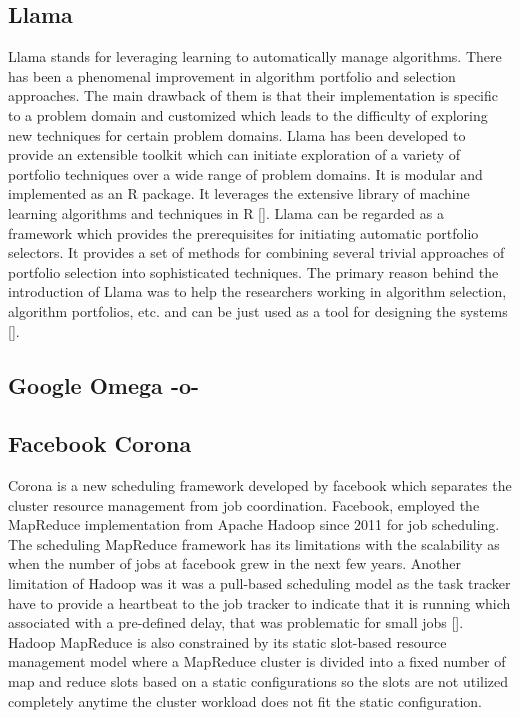       
\subsection{Llama}

Llama stands for leveraging learning to automatically manage
algorithms. There has been a phenomenal improvement in algorithm
portfolio and selection approaches. The main drawback of them is that
their implementation is specific to a problem domain and customized
which leads to the difficulty of exploring new techniques for certain
problem domains. Llama has been developed to provide an extensible
toolkit which can initiate exploration of a variety of portfolio
techniques over a wide range of problem domains. It is modular and
implemented as an R package. It leverages the extensive library of
machine learning algorithms and techniques in R [\cite{lla1}]. Llama can
be regarded as a framework which provides the prerequisites for
initiating automatic portfolio selectors. It provides a set of methods
for combining several trivial approaches of portfolio selection into
sophisticated techniques. The primary reason behind the introduction
of Llama was to help the researchers working in algorithm selection,
algorithm portfolios, etc. and can be just used as a tool for
designing the systems [\cite{lla1}].
     
\subsection{Google Omega -o-}



\subsection{Facebook Corona}

Corona is a new scheduling framework developed by facebook which
separates the cluster resource management from job coordination.
Facebook, employed the MapReduce implementation from Apache Hadoop
since 2011 for job scheduling. The scheduling MapReduce framework has
its limitations with the scalability as when the number of jobs at
facebook grew in the next few years. Another limitation of Hadoop was
it was a pull-based scheduling model as the task tracker have to
provide a heartbeat to the job tracker to indicate that it is running
which associated with a pre-defined delay, that was problematic for
small jobs [\cite{www-facebook-corona}]. Hadoop MapReduce is also
constrained by its static slot-based resource management model where a
MapReduce cluster is divided into a fixed number of map and reduce
slots based on a static configurations so the slots are not utilized
completely anytime the cluster workload does not fit the static
configuration.

